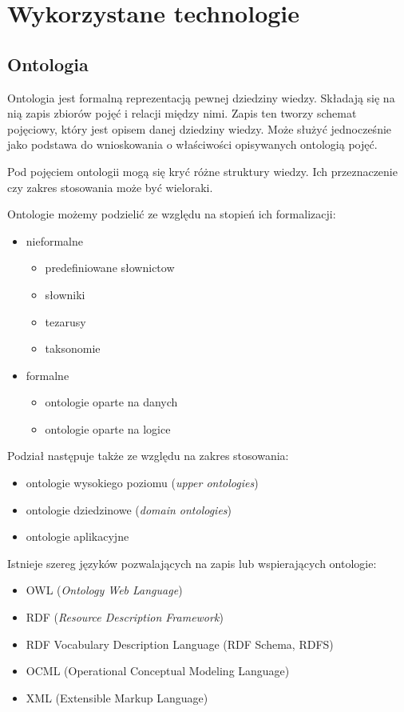 \section{Wykorzystane technologie}
\label{cha:technologie}

\subsection{Ontologia}
\label{sec:ont}

Ontologia jest formalną reprezentacją pewnej dziedziny wiedzy. Składają się na nią zapis zbiorów pojęć i relacji między nimi. Zapis ten tworzy schemat pojęciowy, który jest opisem danej dziedziny wiedzy. Może służyć jednocześnie jako podstawa do wnioskowania o właściwości opisywanych ontologią pojęć.	

Pod pojęciem ontologii mogą się kryć różne struktury wiedzy. Ich przeznaczenie czy zakres stosowania może być wieloraki.

Ontologie możemy podzielić ze względu na stopień ich formalizacji:
\begin{itemize}
\item nieformalne
	\begin{itemize}
		\item predefiniowane słownictow
		\item słowniki
		\item tezarusy
		\item taksonomie
	\end{itemize}
\item formalne
	\begin{itemize}
		\item ontologie oparte na danych
		\item ontologie oparte na logice
	\end{itemize}
\end{itemize}

Podział następuje także ze względu na zakres stosowania:
\begin{itemize}
\item ontologie wysokiego poziomu (\textit{upper ontologies})
\item ontologie dziedzinowe (\textit{domain ontologies})
\item ontologie aplikacyjne
\end{itemize}

Istnieje szereg języków pozwalających na zapis lub wspierających ontologie:
\begin{itemize}
\item OWL (\textit{Ontology Web Language})
\item RDF (\textit{Resource Description Framework})
\item RDF Vocabulary Description Language (RDF Schema, RDFS)
\item OCML (Operational Conceptual Modeling Language)
\item XML (Extensible Markup Language)
\end{itemize}

